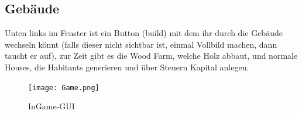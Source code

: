 \documentclass{scrartcl}
\begin{document}
\subsection{Gebäude}
Unten links im Fenster ist ein Button (build) mit dem ihr durch die Gebäude wechseln könnt (falls dieser nicht sichtbar ist, einmal Vollbild machen, dann taucht er auf), zur Zeit gibt es die Wood Farm, welche Holz abbaut, und normale Houses, die Habitants generieren und über Steuern Kapital anlegen.
\begin{figure}[H]
	\texttt{[image: Game.png]}
	\caption{InGame-GUI}
	\label{fig:inGame}
\end{figure}

    
\end{document}
